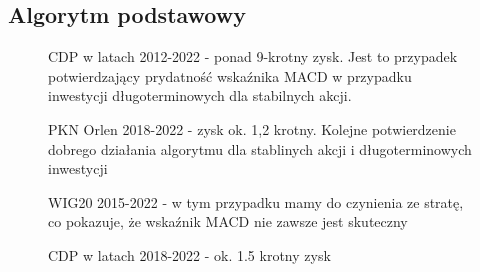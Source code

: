\documentclass{article}
\begin{document}
    \subsection{Algorytm podstawowy}
    \begin{figure}[H]
        \noindent{}
        \caption{CDP w latach 2012-2022 - ponad 9-krotny zysk. Jest to przypadek potwierdzający
        prydatność wskaźnika MACD w przypadku inwestycji długoterminowych dla stabilnych akcji.}
    \end{figure}
    \begin{figure}[H]
        \noindent{}
        \caption{PKN Orlen 2018-2022 - zysk ok. 1,2 krotny. Kolejne potwierdzenie dobrego działania algorytmu dla stablinych akcji i długoterminowych inwestycji}
    \end{figure}
    \begin{figure}[H]
        \noindent{}
        \caption{WIG20 2015-2022 - w tym przypadku mamy do czynienia ze stratę, co pokazuje, że wskaźnik MACD nie zawsze jest skuteczny}
    \end{figure}
    \begin{figure}[H]
        \noindent{}
        \caption{CDP w latach 2018-2022 - ok. 1.5 krotny zysk}
    \end{figure}
    
\end{document}
